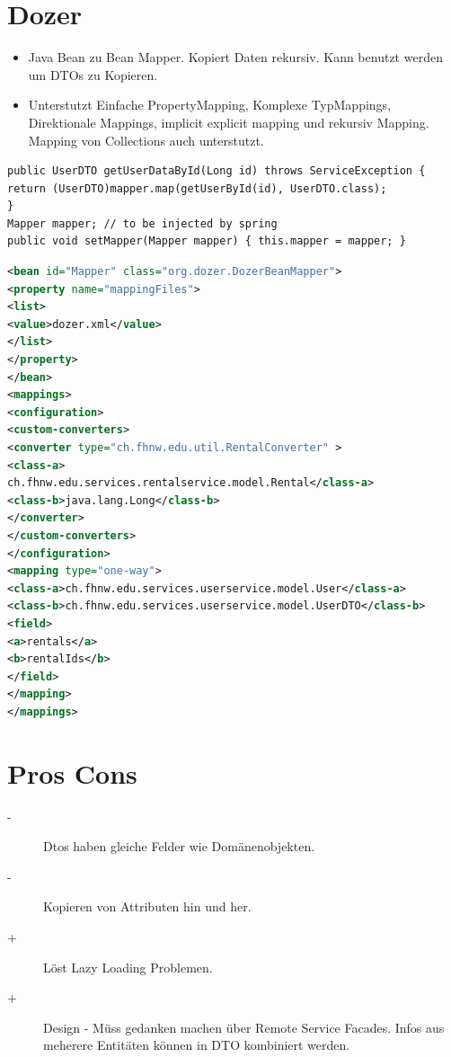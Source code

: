 \documentclass[a4paper,10pt]{scrreprt}
\begin{document}
\section{Dozer}
\begin{itemize}
 \item Java Bean zu Bean Mapper. Kopiert Daten rekursiv. Kann benutzt werden um DTOs zu Kopieren.
 \item Unterstutzt Einfache PropertyMapping, Komplexe TypMappings, Direktionale Mappings, implicit explicit mapping und 
rekursiv Mapping. Mapping von Collections auch unterstutzt.
\end{itemize}
\begin{lstlisting}[caption=DTO Lösung mit Dozer]
 public UserDTO getUserDataById(Long id) throws ServiceException {
return (UserDTO)mapper.map(getUserById(id), UserDTO.class);
}
Mapper mapper; // to be injected by spring
public void setMapper(Mapper mapper) { this.mapper = mapper; }
\end{lstlisting}
\begin{lstlisting}[language=xml]
 <bean id="Mapper" class="org.dozer.DozerBeanMapper">
<property name="mappingFiles">
<list>
<value>dozer.xml</value>
</list>
</property>
</bean>
<mappings>
<configuration>
<custom-converters>
<converter type="ch.fhnw.edu.util.RentalConverter" >
<class-a>
ch.fhnw.edu.services.rentalservice.model.Rental</class-a>
<class-b>java.lang.Long</class-b>
</converter>
</custom-converters>
</configuration>
<mapping type="one-way">
<class-a>ch.fhnw.edu.services.userservice.model.User</class-a>
<class-b>ch.fhnw.edu.services.userservice.model.UserDTO</class-b>
<field>
<a>rentals</a>
<b>rentalIds</b>
</field>
</mapping>
</mappings>
\end{lstlisting}

\section{Pros Cons}
\begin{description}
 \item [-] Dtos haben gleiche Felder wie Domänenobjekten.
 \item [-] Kopieren von Attributen hin und her.
 \item [+] Löst Lazy Loading Problemen.
 \item[+] Design - Müss gedanken machen über Remote Service Facades. Infos aus meherere Entitäten können in DTO 
kombiniert werden. 
\end{description}
\end{document}
